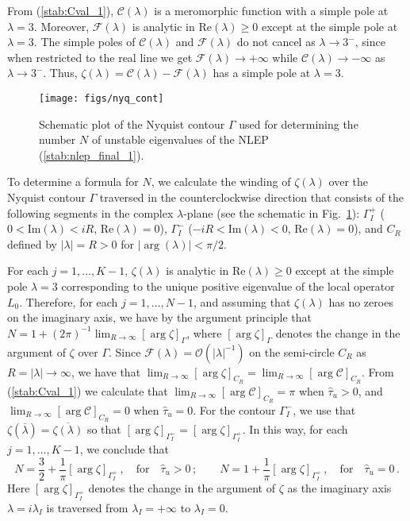 \documentclass{article}%
\begin{document}
From (\ref{stab:Cval_1}), $\mathcal{C}(\lambda)$ is a meromorphic
function with a simple pole at $\lambda=3$. Moreover,
$\mathcal{F}(\lambda)$ is analytic in $\mbox{Re}(\lambda)\geq 0$
except at the simple pole at $\lambda=3$. The simple poles of
$\mathcal{C}(\lambda)$ and $\mathcal{F}(\lambda)$ do not cancel as
$\lambda\to3^{-}$, since when restricted to the real line we get
$\mathcal{F}(\lambda)\to+\infty$ while
$\mathcal{C}(\lambda)\to-\infty$ as $\lambda\to 3^{-}$. Thus,
$\zeta(\lambda)=\mathcal{C}(\lambda)-\mathcal{F}(\lambda)$ has a
simple pole at $\lambda=3$.

\begin{figure}[htbp]
\centering
\texttt{[image: figs/nyq\_cont]}
\caption{\label{fig:nyquist}Schematic plot of the Nyquist contour
  $\Gamma$ used for determining the number $N$ of unstable eigenvalues
  of the NLEP (\ref{stab:nlep_final_1}).}
\end{figure}

To determine a formula for $N$, we calculate the winding of
$\zeta(\lambda)$ over the Nyquist contour $\Gamma$ traversed in the
counterclockwise direction that consists of the following segments in
the complex $\lambda$-plane (see the schematic in
Fig.~\ref{fig:nyquist}): $\Gamma_I^+$ ($0<\textrm{Im}(\lambda)<iR$,
$\textrm{Re}(\lambda)=0$), $\Gamma_I^-$ ($-iR<\textrm{Im}(\lambda)<0$,
$\textrm{Re}(\lambda)=0$), and $C_R$ defined by $|\lambda| = R >
0$ for $|\arg(\lambda)| < \pi/2$.

For each $j=1,\ldots,K-1$, $\zeta(\lambda)$ is analytic in
$\mbox{Re}(\lambda)\geq 0$ except at the simple pole $\lambda = 3$
corresponding to the unique positive eigenvalue of the local operator
$L_0$. Therefore, for each $j=1,\ldots,N-1$, and assuming that
$\zeta(\lambda)$ has no zeroes on the imaginary axis, we have by the
argument principle that $N = 1 + (2\pi)^{-1}\lim_{R\to\infty} \left[\arg
  \zeta \right]_\Gamma$, where $\left[\arg \zeta \right]_\Gamma$
denotes the change in the argument of $\zeta$ over $\Gamma$.  Since
${\mathcal F}(\lambda)={\mathcal O}(|\lambda|^{-1})$ on the
semi-circle $C_R$ as $R=|\lambda|\to \infty$, we have that
$\lim_{R\to\infty}\left[\arg \zeta \right]_{C_R}=
\lim_{R\to\infty}\left[\arg {\mathcal C} \right]_{C_R}$. From
(\ref{stab:Cval_1}) we calculate that $\lim_{R\to\infty}\left[\arg
  {\mathcal C} \right]_{C_R}=\pi$ when $\hat{\tau}_u>0$, and
$\lim_{R\to\infty}\left[\arg {\mathcal C} \right]_{C_R}=0$ when
$\hat{\tau}_u=0$.  For the contour $\Gamma_I^-$, we use that
$\zeta(\overline{\lambda}) = \overline{\zeta(\lambda)}$ so that
$\left[\arg \zeta \right]_{\Gamma_I^-} = \left[\arg
  \zeta\right]_{\Gamma_I^+}$.  In this way, for each $j=1,\ldots,K-1$,
we conclude that
\begin{equation}
  N = \frac{3}{2} + \frac{1}{\pi} \left[\arg \zeta \right]_{\Gamma_I^{+}} \,,
 \quad \mbox{for} \quad \hat{\tau}_u>0 \,; \qquad
  N = 1 + \frac{1}{\pi} \left[\arg \zeta \right]_{\Gamma_I^{+}} \,,
 \quad \mbox{for} \quad \hat{\tau}_u=0 \,. \label{key:wind}
\end{equation}
Here $\left[\arg \zeta \right]_{\Gamma_I^{+}}$ denotes the change
in the argument of $\zeta$ as the imaginary axis $\lambda=i\lambda_I$ is
traversed from $\lambda_I=+\infty$ to $\lambda_I=0$.
\end{document}

